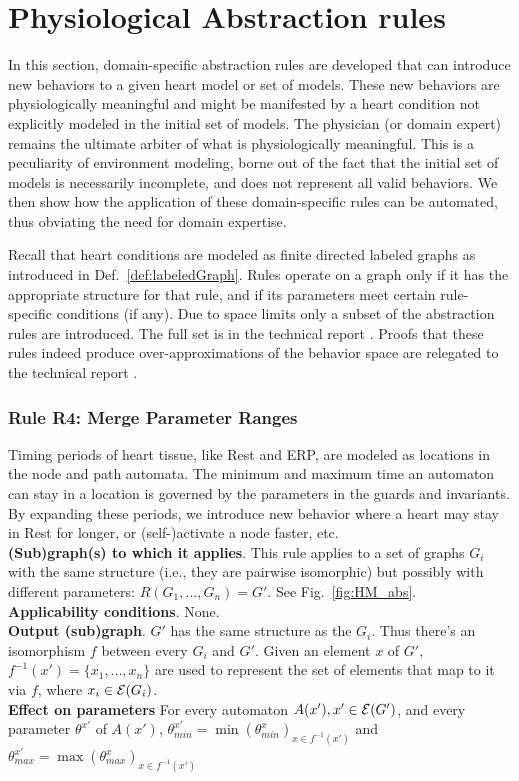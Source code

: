 \section{Physiological Abstraction rules}
\label{abstractionRules} 
In this section, domain-specific abstraction rules are developed that can introduce new behaviors to a given heart model or set of models. 
These new behaviors are physiologically meaningful and might be manifested by a heart condition not explicitly modeled in the initial set of models.
The physician (or domain expert) remains the ultimate arbiter of what is physiologically meaningful.
This is a peculiarity of environment modeling, borne out of the fact that the initial set of models is necessarily incomplete, and does not represent all valid behaviors.
We then show how the application of these domain-specific rules can be automated, thus obviating the need for domain expertise.

Recall that heart conditions are modeled as finite directed labeled graphs as introduced in Def.~\ref{def:labeledGraph}.
Rules operate on a graph only if it has the appropriate structure for that rule, and if its parameters meet certain rule-specific conditions (if any).
Due to space limits only a subset of the abstraction rules are introduced. 
The full set is in the technical report \cite{regar_tech}.
Proofs that these rules indeed produce over-approximations of the behavior space are relegated to the technical report \cite{regar_tech}.
%
%

\subsubsection{Rule R4: Merge Parameter Ranges}
Timing periods of heart tissue, like Rest and ERP, are modeled as locations in the node and path automata. 
The minimum and maximum time an automaton can stay in a location is governed by the parameters in the guards and invariants. 
By expanding these periods, we introduce new behavior where a heart may stay in Rest for longer, or (self-)activate a node faster, etc.
\\
\textbf{(Sub)graph(s) to which it applies}.
This rule applies to a set of graphs $G_i$ with the same structure (i.e., they are pairwise isomorphic) but possibly with different parameters: $R(G_1,\ldots,G_n) = G'$.
See Fig.~\ref{fig:HM_abs}.\\
\textbf{Applicability conditions}.
None.\\
\textbf{Output (sub)graph}.
$G'$ has the same structure as the $G_i$.
Thus there's an isomorphism $f$ between every $G_i$ and $G'$.
Given an element $x$ of $G'$, $f^{-1}(x') = \{x_1,\dots,x_n\}$ are used to represent the set of elements that map to it via $f$, where $x_i \in \mathcal{E}(G_i)$.\\
\textbf{Effect on parameters}
For every automaton $A(x'), x' \in \mathcal{E}(G')$, and every parameter $\theta^{x'}$ of $A(x')$, 
$\theta_{min}^{x'} = \min(\theta^x_{min})_{x \in f^{-1}(x') }$ and 
$\theta_{max}^{x'} = \max(\theta^x_{max})_{x \in f^{-1}(x') }$


